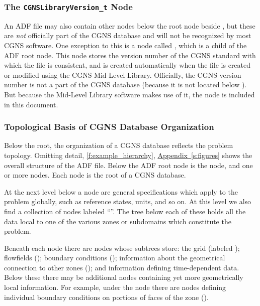 \subsubsection{The \texttt{CGNSLibraryVersion\_t} Node}

An ADF file may also contain other nodes below the root node beside
, but these are \emph{not} officially part of the
CGNS database and will not be recognized by most CGNS software.
One exception to this is a node called ,
which is a child of the ADF root node.
This node stores the version number of the CGNS standard with which
the file is consistent, and is created automatically when the file is
created or modified using the CGNS Mid-Level Library.
Officially, the CGNS version number is not a part of the CGNS
database (because it is not located below ).
But because the Mid-Level Library software makes use of it, the node is
included in this document.

\subsubsection{Topological Basis of CGNS Database Organization}

Below the root, the organization of a CGNS database reflects the problem
topology.
Omitting detail, \autoref{f:example_hierarchy},
\hyperref[s:figures]{Appendix~\ref*{s:figures}} shows the overall
structure of the ADF file.
Below the ADF root node is the  node, and
one or more  nodes.
Each  node is the root of a CGNS database.

At the next level below a  node are general
specifications which apply to the problem globally, such as reference
states, units, and so on.
At this level we also find a collection of nodes labeled
``''.
The tree below each of these holds all the data local to one of the
various zones or subdomains which constitute the problem.

Beneath each  node there are nodes whose subtrees
store: the grid (labeled ); flowfields
(); boundary conditions ();
information about the geometrical connection to other zones
(); and information defining time-dependent
data. Below these there may be additional nodes containing yet more
geometrically local information. For example, under the 
node there are nodes defining individual boundary conditions on portions
of faces of the zone ().

